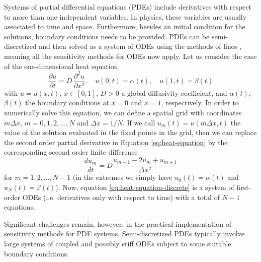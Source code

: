 Systems of partial differential equations (PDEs) include derivatives with respect to more than one independent variables. 
In physics, these variables are usually associated to time and space. 
Furthermore, besides an initial condition for the solutions, boundary conditions needs to be provided. 
PDEs can be semi-discretized and then solved as a system of ODEs using the methods of lines \cite{ascher2008numerical}, meaning all the sensitivity methods for ODEs now apply. 
Let us consider the case of the one-dimensional heat equation
\begin{equation}
 \frac{\partial u}{\partial t}
 = 
 D \, 
 \frac{\partial^2 u}{\partial x^2}, 
 \quad u(0, t) = \alpha(t), 
 \quad u(1, t) = \beta(t)
 \label{eq:heat-equation}
\end{equation}
with $u = u(x, t)$, $x \in [0,1]$, $D > 0$ a global diffusivity coefficient, and $\alpha(t)$, $\beta(t)$ the boundary conditions at $x=0$ and $x=1$, respectively.
In order to numerically solve this equation, we can define a spatial grid with coordinates $m \Delta x$, $m=0, 1, 2, \ldots, N$ and $\Delta x = 1 / N$.
If we call $u_m(t) = u(m \Delta x, t)$ the value of the solution evaluated in the fixed points in the grid, then we can replace the second order partial derivative in Equation \eqref{eq:heat-equation} by the corresponding second order finite difference
\begin{equation}
 \frac{d u_m}{dt} 
 = 
 D 
 \frac{u_{m-1} - 2u_m + u_{m+1}}{\Delta x^2}
 \label{eq:heat-equation-discrete}
\end{equation}
for $m = 1, 2, \ldots, N-1$ (in the extremes we simply have $u_0(t) = \alpha(t)$ and $u_N(t)=\beta(t)$).
Now, equation \eqref{eq:heat-equation-discrete} is a system of first-order ODEs  (i.e. derivatives only with respect to time) with a total of $N-1$ equations.

Significant challenges remain, however, in the practical implementation of sensitivity methods for PDE systems. 
Semi-discretized PDEs typically involve large systems of coupled and possibly stiff ODEs subject to some suitable boundary conditions. 

